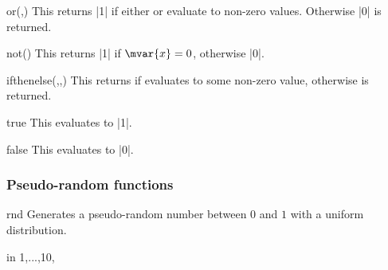 \begin{math-function}{or(,)}
\mathcommand
    This returns |1| if either  or  evaluate to non-zero
    values. Otherwise |0| is returned.
\begin{codeexample}[]
 \pgfmathresult
\end{codeexample}
\end{math-function}

\begin{math-function}{not()}
\mathcommand
    This returns |1| if $\mvar{x}=0$, otherwise |0|.
\begin{codeexample}[]
 \pgfmathresult
\end{codeexample}
\end{math-function}

\begin{math-function}{ifthenelse(,,)}
\mathcommand
    This returns  if  evaluates to some non-zero value,
    otherwise  is returned.
\begin{codeexample}[]
 \pgfmathresult
\end{codeexample}
\end{math-function}

\begin{math-function}{true}
\mathcommand
    This evaluates to |1|.
\begin{codeexample}[]
 \pgfmathresult
\end{codeexample}
\end{math-function}

\begin{math-function}{false}
\mathcommand
    This evaluates to |0|.
\begin{codeexample}[]
 \pgfmathresult
\end{codeexample}
\end{math-function}


\subsubsection{Pseudo-random functions}
\label{pgfmath-functions-random}

\begin{math-function}{rnd}
\mathcommand
    Generates a pseudo-random number between $0$ and $1$ with a uniform
    distribution.
\begin{codeexample}[pre={\pgfmathsetseed{1}}]
\foreach \x in {1,...,10}{\pgfmathresult, }
\end{codeexample}
\end{math-function}

